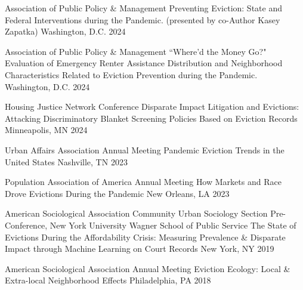 
\begin{cventries}
    
  \cventry
    {Association of Public Policy \& Management} %
    {Preventing Eviction: State and Federal Interventions during the Pandemic. (presented by co-Author Kasey Zapatka)} %
    {Washington, D.C.} %
    {2024} %
    {}

  \cventry
    {Association of Public Policy \& Management} %
    {“Where’d the Money Go?" Evaluation of Emergency Renter Assistance Distribution and Neighborhood Characteristics Related to Eviction Prevention during the Pandemic.} %
    {Washington, D.C.} %
    {2024} %
    {}

  \cventry
    {Housing Justice Network Conference} %
    {Disparate Impact Litigation and Evictions: Attacking Discriminatory Blanket Screening Policies Based on Eviction Records} %
    {Minneapolis, MN} %
    {2024} %
    {}

  \cventry
    {Urban Affairs Association Annual Meeting} %
    {Pandemic Eviction Trends in the United States} %
    {Nashville, TN} %
    {2023} %
    {}    
    
  \cventry
    {Population Association of America Annual Meeting} %
    {How Markets and Race Drove Evictions During the Pandemic} %
    {New Orleans, LA} %
    {2023} %
    {}
    
  \cventry
    {American Sociological Association Community Urban Sociology Section Pre-Conference, New York University Wagner School of Public Service} %
    {The State of Evictions During the Affordability Crisis: Measuring Prevalence \& Disparate Impact through Machine Learning on Court Records} %
    {New York, NY} %
    {2019} %
    {}
    
  \cventry
    {American Sociological Association Annual Meeting} %
    {Eviction Ecology: Local \& Extra-local Neighborhood Effects} %
    {Philadelphia, PA} %
    {2018} %
    {}
    

\end{cventries}
